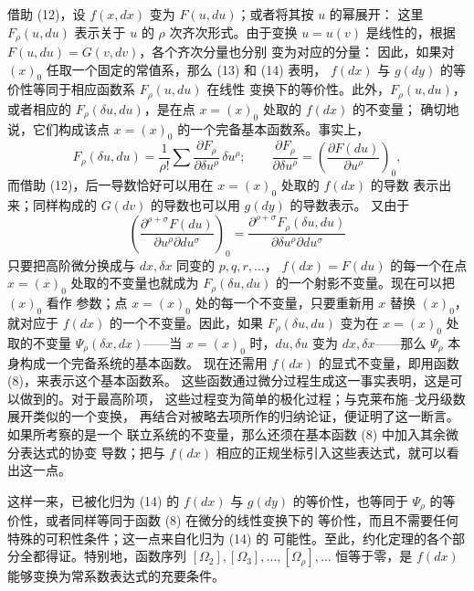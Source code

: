 借助 (12)，设 \(f(x,dx)\) 变为 \(F(u,du)\)；或者将其按 \(u\) 的幂展开：
这里 \(F_\rho(u,du)\) 表示关于 \(u\) 的 \(\rho\) 次齐次形式。由于变换
\(u=u(v)\) 是线性的，根据 \(F(u,du)=G(v,dv)\)，各个齐次分量也分别
变为对应的分量：
因此，如果对 \((x)_0\) 任取一个固定的常值系，那么 (13) 和 (14) 表明，
\(f(dx)\) 与 \(g(dy)\) 的等价性等同于相应函数系 \(F_\rho(u,du)\) 在线性
变换下的等价性。此外，\(F_\rho(u,du)\)，或者相应的
\(F_\rho(\delta u,du)\)，是在点 \(x=(x)_0\) 处取的 \(f(dx)\) 的不变量；
确切地说，它们构成该点 \(x=(x)_0\) 的一个完备基本函数系。事实上，
\[
F_\rho(\delta u,du)=\frac1{\rho!}\sum
\frac{\partial F_\rho}{\partial \delta u^\rho}\,\delta u^\rho;
\qquad
\frac{\partial F_\rho}{\partial \delta u^\rho}
=\left(\frac{\partial F(du)}{\partial u^\rho}\right)_0,
\]
而借助 (12)，后一导数恰好可以用在 \(x=(x)_0\) 处取的 \(f(dx)\) 的导数
表示出来；同样构成的 \(G(dv)\) 的导数也可以用 \(g(dy)\) 的导数表示。
又由于
\[
\left(\frac{\partial^{\rho+\sigma}F(du)}
{\partial u^\rho\partial du^\sigma}\right)_0
=
\frac{\partial^{\rho+\sigma}F_\rho(\delta u,du)}
{\partial\delta u^\rho\partial du^\sigma}
\]
只要把高阶微分换成与 \(dx,\delta x\) 同变的 \(p,q,r,\ldots\)，
\(f(dx)=F(du)\) 的每一个在点 \(x=(x)_0\) 处取的不变量也就成为
\(F_\rho(\delta u,du)\) 的一个射影不变量。现在可以把 \((x)_0\) 看作
参数；点 \(x=(x)_0\) 处的每一个不变量，只要重新用 \(x\) 替换
\((x)_0\)，就对应于 \(f(dx)\) 的一个不变量。因此，如果
\(F_\rho(\delta u,du)\) 变为在 \(x=(x)_0\) 处取的不变量
\(\Psi_\rho(\delta x,dx)\)——当 \(x=(x)_0\) 时，\(du,\delta u\) 变为
\(dx,\delta x\)——那么 \(\Psi_\rho\) 本身构成一个完备系统的基本函数。
现在还需用 \(f(dx)\) 的显式不变量，即用函数 (8)，来表示这个基本函数系。
这些函数通过微分过程生成这一事实表明，这是可以做到的。对于最高阶项，
这些过程变为简单的极化过程；与克莱布施--戈丹级数展开类似的一个变换，
再结合对被略去项所作的归纳论证，便证明了这一断言。如果所考察的是一个
联立系统的不变量，那么还须在基本函数 (8) 中加入其余微分表达式的协变
导数；把与 \(f(dx)\) 相应的正规坐标引入这些表达式，就可以看出这一点。

这样一来，已被化归为 (14) 的 \(f(dx)\) 与 \(g(dy)\) 的等价性，也等同于
\(\Psi_\rho\) 的等价性，或者同样等同于函数 (8) 在微分的线性变换下的
等价性，而且不需要任何特殊的可积性条件；这一点来自化归为 (14) 的
可能性。至此，约化定理的各个部分全都得证。特别地，函数序列
\([\Omega_2],[\Omega_3],\ldots,[\Omega_\rho],\ldots\) 恒等于零，是
\(f(dx)\) 能够变换为常系数表达式的充要条件。

